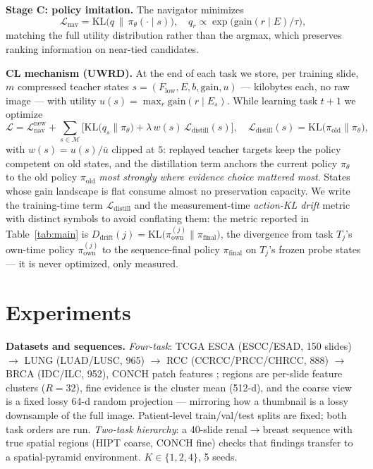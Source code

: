 \documentclass{article}
\newcommand{\method}{UWRD}               %
\begin{document}
\textbf{Stage C: policy imitation.} The navigator minimizes
\begin{equation}
\mathcal{L}_{\mathrm{nav}} =
\mathrm{KL}\!\big(q \,\|\, \pi_\theta(\cdot \mid s)\big),\quad
q_r \propto \exp\!\big(\mathrm{gain}(r \mid E)/\tau\big),
\label{eq:imit}
\end{equation}
matching the full utility distribution rather than the argmax, which
preserves ranking information on near-tied candidates.

\textbf{CL mechanism (\method{}).} At the end of each task we store, per
training slide, $m$ compressed teacher states
$s=(F_{\mathrm{low}}, E, b, \mathrm{gain}, u)$ --- kilobytes each, no raw
image --- with utility $u(s) = \max_r \mathrm{gain}(r \mid E_s)$. While
learning task $t{+}1$ we optimize
\begin{equation}
\mathcal{L} = \mathcal{L}_{\mathrm{nav}}^{\mathrm{new}}
+ \sum_{s \in \mathcal{M}} \Big[
\mathrm{KL}\big(q_s \| \pi_\theta\big)
+ \lambda\, w(s)\,
\mathcal{L}_{\mathrm{distill}}(s) \Big],\quad
\mathcal{L}_{\mathrm{distill}}(s) = \mathrm{KL}\big(\pi_{\mathrm{old}} \| \pi_\theta\big),
\label{eq:cl}
\end{equation}
with $w(s) = u(s)/\bar u$ clipped at $5$: replayed teacher targets keep the
policy competent on old states, and the distillation term anchors the current
policy $\pi_\theta$ to the old policy $\pi_{\mathrm{old}}$ \emph{most strongly
where evidence choice mattered most}. States whose gain landscape is flat
consume almost no preservation capacity. We write the training-time term
$\mathcal{L}_{\mathrm{distill}}$ and the measurement-time \emph{action-KL
drift} metric with distinct symbols to avoid conflating them: the metric
reported in Table~\ref{tab:main} is
$D_{\mathrm{drift}}(j) = \mathrm{KL}\big(\pi^{(j)}_{\mathrm{own}} \|
\pi_{\mathrm{final}}\big)$, the divergence from task $T_j$'s own-time policy
$\pi^{(j)}_{\mathrm{own}}$ to the sequence-final policy $\pi_{\mathrm{final}}$
on $T_j$'s frozen probe states --- it is never optimized, only measured.

\section{Experiments}
\label{sec:exp}

\textbf{Datasets and sequences.} \emph{Four-task}: TCGA ESCA (ESCC/ESAD,
150 slides) $\to$ LUNG (LUAD/LUSC, 965) $\to$ RCC (CCRCC/PRCC/CHRCC, 888)
$\to$ BRCA (IDC/ILC, 952), CONCH patch features \cite{lu2024conch};
regions are per-slide feature clusters ($R{=}32$), fine evidence is the
cluster mean (512-d), and the coarse view is a fixed lossy 64-d random
projection --- mirroring how a thumbnail is a lossy downsample of the full
image. Patient-level train/val/test splits are fixed; both task orders are
run. \emph{Two-task hierarchy}: a 40-slide renal$\to$breast sequence with
true spatial regions (HIPT \cite{chen2022hipt} coarse, CONCH fine) checks
that findings transfer to a spatial-pyramid environment.
$K \in \{1,2,4\}$, 5 seeds.
\end{document}
